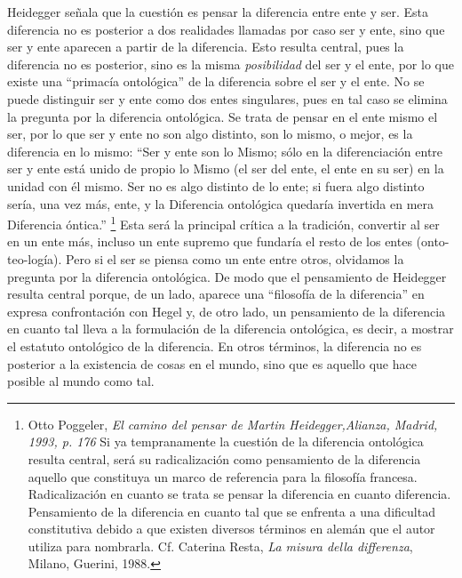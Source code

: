 \documentclass{book}
\begin{document}
Heidegger señala que la cuestión es pensar la diferencia entre ente y
ser. Esta diferencia no es posterior a dos realidades llamadas por caso
ser y ente, sino que ser y ente aparecen a partir de la diferencia. Esto
resulta central, pues la diferencia no es posterior, sino es la misma
\emph{posibilidad} del ser y el ente, por lo que existe una \enquote{primacía
ontológica} de la diferencia sobre el ser y el ente. No se puede
distinguir ser y ente como dos entes singulares, pues en tal caso se
elimina la pregunta por la diferencia ontológica. Se trata de pensar en
el ente mismo el ser, por lo que ser y ente no son algo distinto, son lo
mismo, o mejor, es la diferencia en lo mismo: \enquote{Ser y ente son lo Mismo;
sólo en la diferenciación entre ser y ente está unido de propio lo Mismo
(el ser del ente, el ente en su ser) en la unidad con él mismo. Ser no
es algo distinto de lo ente; si fuera algo distinto sería, una vez más,
ente, y la Diferencia ontológica quedaría invertida en mera Diferencia
óntica.} \footnote{Otto Poggeler, \emph{El camino del pensar de Martin
  Heidegger,Alianza, Madrid, 1993, p. 176} Si ya tempranamente la
  cuestión de la diferencia ontológica resulta central, será su
  radicalización como pensamiento de la diferencia aquello que
  constituya un marco de referencia para la filosofía francesa.
  Radicalización en cuanto se trata se pensar la diferencia en cuanto
  diferencia. Pensamiento de la diferencia en cuanto tal que se enfrenta
  a una dificultad constitutiva debido a que existen diversos términos
  en alemán que el autor utiliza para nombrarla. Cf. Caterina Resta,
  \emph{La misura della differenza}, Milano, Guerini, 1988.} Esta será
la principal crítica a la tradición, convertir al ser en un ente más,
incluso un ente supremo que fundaría el resto de los entes
(onto-teo-logía). Pero si el ser se piensa como un ente entre otros,
olvidamos la pregunta por la diferencia ontológica. De modo que el
pensamiento de Heidegger resulta central porque, de un lado, aparece una
\enquote{filosofía de la diferencia} en expresa confrontación con Hegel y, de
otro lado, un pensamiento de la diferencia en cuanto tal lleva a la
formulación de la diferencia ontológica, es decir, a mostrar el estatuto
ontológico de la diferencia. En otros términos, la diferencia no es
posterior a la existencia de cosas en el mundo, sino que es aquello que
hace posible al mundo como tal.
\end{document}

